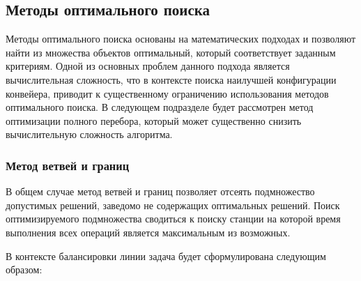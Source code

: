 \subsection{Методы оптимального поиска}
Методы оптимального поиска основаны на математических подходах и позволяют найти из множества объектов оптимальный, который соответствует заданным критериям. Одной из основных проблем данного подхода является вычислительная сложность, что в контексте поиска наилучшей конфигурации конвейера, приводит к существенному ограничению использования методов оптимального поиска. В следующем подразделе будет рассмотрен метод оптимизации полного перебора, который может существенно снизить вычислительную сложность алгоритма.

\subsubsection*{Метод ветвей и границ}
В общем случае метод ветвей и границ позволяет отсеять подмножество допустимых решений, заведомо не содержащих оптимальных решений. Поиск оптимизируемого подмножества сводиться к поиску станции на которой время выполнения всех операций является максимальным из возможных.

В контексте балансировки линии задача будет сформулирована следующим образом:

